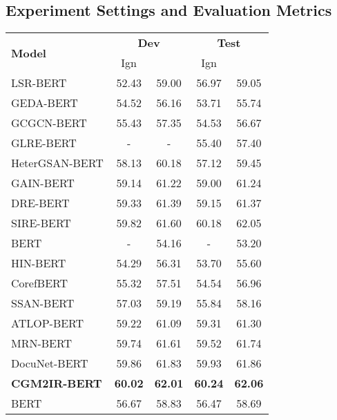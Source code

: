 \documentclass[11pt]{article}
\begin{document}
\subsection{Experiment Settings and Evaluation Metrics}
\begin{table*}[h]
	\centering
	\small
	\begin{tabular}{lcccc}
		\toprule
		\multirow{2}{*}{\textbf{Model}} & \multicolumn{2}{c}{\textbf{Dev}} & \multicolumn{2}{c}{\textbf{Test}} \\ \cline{2-5} 
		& Ign   &    	& Ign   &   \\ \hline 
		LSR-BERT \citep{nan-etal-2020-reasoning} & 52.43     & 59.00  & 56.97  & 59.05      \\ 
		GEDA-BERT \citep{li-etal-2020-graph} & 54.52 &  56.16 &  53.71  & 55.74      \\
		GCGCN-BERT \citep{zhou-etal-2020-global} & 55.43  & 57.35 & 54.53    & 56.67  \\
		GLRE-BERT \citep{wang-etal-2020-global} & -     & -  & 55.40    & 57.40  \\
		HeterGSAN-BERT \citep{DBLP:conf/aaai/XuCZ21} & 58.13 &  60.18 &  57.12 &  59.45  \\	
		GAIN-BERT \citep{zeng-etal-2020-double} & 59.14 & 61.22  &  59.00 &  61.24  \\ 
		DRE-BERT \citep{xu-etal-2021-discriminative} & 59.33 &  61.39 &  59.15  & 61.37  \\
		SIRE-BERT \citep{zeng-etal-2021-sire} &  59.82 &  61.60   & 60.18 &  62.05  \\  \midrule \midrule
		BERT \citep{DBLP:journals/corr/abs-1909-11898} & - &  54.16 &  - &  53.20  \\ 
		HIN-BERT \citep{DBLP:conf/pakdd/TangC0CFWY20} & 54.29  & 56.31 &  53.70  & 55.60  \\ 
		CorefBERT \citep{ye-etal-2020-coreferential} & 55.32 &  57.51 & 54.54 & 56.96  \\ 
		SSAN-BERT \citep{DBLP:conf/aaai/XuWLZM21} & 57.03 &  59.19 & 55.84 & 58.16  \\ 
		ATLOP-BERT \citep{DBLP:conf/aaai/Zhou0M021} & 59.22 &  61.09 & 59.31 & 61.30  \\ 
		MRN-BERT \citep{li-etal-2021-mrn} & 59.74 &  61.61  & 59.52 & 61.74  \\ 
		DocuNet-BERT\citep{DBLP:conf/ijcai/ZhangCXDTCHSC21} & 59.86     & 61.83  & 59.93   & 61.86  \\ \hdashline 
		\textbf{CGM2IR-BERT}  & \textbf{60.02}  & \textbf{62.01}  & \textbf{60.24}  & \textbf{62.06}  \\ \hline BERT \citep{DBLP:journals/corr/abs-1909-11898} & 56.67 & 58.83 & 56.47 & 58.69  \\ 

\end{tabular}
\end{table*}
\end{document}
